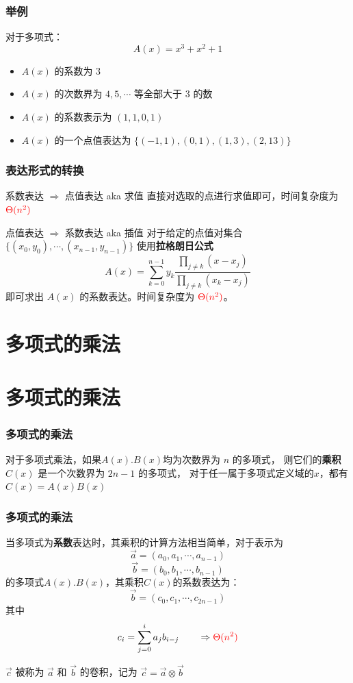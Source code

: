\documentclass[UTF8]{ctexbeamer}
\begin{document}
\begin{frame}
    \frametitle{举例}
    对于多项式：
    $$ A(x) = x^3 + x^2 + 1 $$

    \begin{itemize}
        \item $A(x)$ 的系数为 $3$
        \item $A(x)$ 的次数界为 $4, 5, \cdots$ 等全部大于 $3$ 的数
        \item $A(x)$ 的系数表示为 $ (1, 1, 0, 1)$
        \item $A(x)$ 的一个点值表达为 $\{ (-1, 1), (0, 1), (1, 3), (2, 13) \}$
    \end{itemize}
\end{frame}

\begin{frame}
    \frametitle{表达形式的转换}
    \begin{block}{系数表达 $\Rightarrow$ 点值表达 aka 求值}
        直接对选取的点进行求值即可，时间复杂度为 $\textcolor{red}{\Theta(n^2)}$
    \end{block}
    \begin{block}{点值表达 $\Rightarrow$ 系数表达 aka 插值}
        对于给定的点值对集合 $\{ (x_0, y_0), \cdots, (x_{n-1}, y_{n-1})\}$
        使用\textbf{拉格朗日公式}
        $$A(x) = \sum_{k = 0}^{n - 1} y_k \frac{\prod_{j \neq k}(x - x_j)}{\prod_{j \neq k}(x_k - x_j)}$$
        即可求出 $A(x)$ 的系数表达。时间复杂度为 $\textcolor{red}{\Theta(n^2)}$。
    \end{block}
\end{frame}

\section{多项式的乘法}

\section{多项式的乘法}

\begin{frame}
    \frametitle{多项式的乘法}
    对于多项式乘法，如果$A(x). B(x)$均为次数界为 $n$ 的多项式，
    则它们的\textbf{乘积} $C(x)$ 是一个次数界为 $2n - 1$ 的多项式，
    对于任一属于多项式定义域的$x$，都有$C(x) = A(x)B(x)$
\end{frame}

\begin{frame}
    \frametitle{多项式的乘法}
    当多项式为\textbf{系数}表达时，其乘积的计算方法相当简单，对于表示为
    $$\vec{a} = (a_0, a_1, \cdots, a_{n-1})$$
    $$\vec{b} = (b_0, b_1, \cdots, b_{n-1})$$
    的多项式$A(x). B(x)$，其乘积$C(x)$的系数表达为：
    $$\vec{b} = (c_0, c_1, \cdots, c_{2n-1})$$
    其中
    $$c_i = \sum_{j = 0}^{i} a_j b_{i - j} \qquad \Rightarrow \textcolor{red}{\Theta(n^2)}$$
    \begin{block}{}
        $\vec{c}$ 被称为 $\vec{a}$ 和 $\vec{b}$ 的卷积，记为
        $\vec{c} = \vec{a} \otimes \vec{b}$
    \end{block}
\end{frame}
\end{document}
